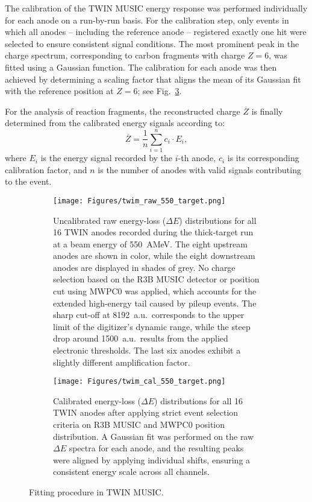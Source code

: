 The calibration of the TWIN MUSIC energy response was performed individually for each anode on a run-by-run basis. For the calibration step, only events in which all anodes -- including the reference anode -- registered exactly one hit were selected to ensure consistent signal conditions. The most prominent peak in the charge spectrum, corresponding to carbon fragments with charge \(Z = 6\), was fitted using a Gaussian function. The calibration for each anode was then achieved by determining a scaling factor that aligns the mean of its Gaussian fit with the reference position at \(Z = 6\); see Fig.~\ref{fig:calibration}.

For the analysis of reaction fragments, the reconstructed charge \(\overline{Z}\) is finally determined from the calibrated energy signals according to:
\begin{equation}
\overline{Z} = \frac{1}{n} \sum_{i=1}^{n} c_i \cdot E_i,
\end{equation}
where \(E_i\) is the energy signal recorded by the \(i\)-th anode, \(c_i\) is its corresponding calibration factor, and \(n\) is the number of anodes with valid signals contributing to the event.

\begin{figure}
     \centering
     \begin{subfigure}[t]{0.49\textwidth}
         \centering
         \texttt{[image: Figures/twim\_raw\_550\_target.png]}
         \caption{
	 Uncalibrated raw energy-loss ($\Delta E$) distributions for all 16 TWIN anodes recorded during the thick-target run at a beam energy of 550~AMeV. The eight upstream anodes are shown in color, while the eight downstream anodes are displayed in shades of grey. No charge selection based on the R3B MUSIC detector or position cut using MWPC0 was applied, which accounts for the extended high-energy tail caused by pileup events. The sharp cut-off at 8192~a.u.\ corresponds to the upper limit of the digitizer's dynamic range, while the steep drop around 1500~a.u.\ results from the applied electronic thresholds. The last six anodes exhibit a slightly different amplification factor.
	 }
         \label{fig:raw_twim}
     \end{subfigure}
     \hfill
     \begin{subfigure}[t]{0.49\textwidth}
         \centering
         \texttt{[image: Figures/twim\_cal\_550\_target.png]}
         \caption{Calibrated energy-loss ($\Delta E$) distributions for all 16 TWIN anodes after applying strict event selection criteria on R3B MUSIC and MWPC0 position distribution. A Gaussian fit was performed on the raw $\Delta E$ spectra for each anode, and the resulting peaks were aligned by applying individual shifts, ensuring a consistent energy scale across all channels.}
         \label{fig:cal_twim_one}
     \end{subfigure}
     \hfill
        \caption{Fitting procedure in TWIN MUSIC.}
        \label{fig:calibration}
\end{figure}
